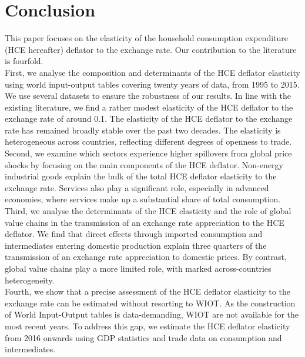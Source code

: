 \documentclass[12pt,a4paper]{paper}
\begin{document}
\section{Conclusion}
\label{sec:ccl}
This paper focuses on the elasticity of the household consumption expenditure (HCE hereafter) deflator to the exchange rate.
Our contribution to the literature is fourfold. \\
First, we analyse the composition and determinants of the HCE deflator elasticity using world input-output tables covering twenty years of data, from 1995 to 2015. 
We use several datasets to ensure the robustness of our results.
In line with the existing literature, we find a rather modest elasticity of the HCE deflator to the exchange rate of around 0.1.
The elasticity of the HCE deflator to the exchange rate has remained broadly stable over the past two decades.
The elasticity is heterogeneous across countries, reflecting different degrees of openness to trade. \\
Second, we examine which sectors experience higher spillovers from global price shocks by focusing on the main components of the HCE deflator. 
Non-energy industrial goods explain the bulk of the total HCE deflator elasticity to the exchange rate. 
Services also play a significant role, especially in advanced economies, where services make up a substantial share of total consumption. \\
Third, we analyse the determinants of the HCE elasticity and the role of global value chains in the transmission of an exchange rate appreciation to the HCE deflator.
We find that direct effects through imported consumption and intermediates entering domestic production explain three quarters of the transmission of an exchange rate appreciation to domestic prices.
By contrast, global value chains play a more limited role, with marked across-countries heterogeneity.\\
Fourth, we show that a precise assessment of the HCE deflator elasticity to the exchange rate can be estimated without resorting to WIOT.
As the construction of World Input-Output tables is data-demanding, WIOT are not available for the most recent years. 
To address this gap, we estimate the HCE deflator elasticity from 2016 onwards using GDP statistics and trade data on consumption and intermediates.
\end{document}
